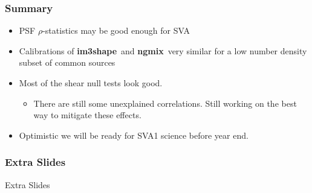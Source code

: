 \documentclass{beamer}
\newcommand{\ngmix}{{\bf ngmix}}
\newcommand{\imshape}{{\bf im3shape}}
\begin{document}
\frame
{
    \frametitle{Summary}

    \begin{itemize}

        \item PSF $\rho$-statistics may be good enough for SVA

        \item Calibrations of \imshape\ and \ngmix\ very similar for a low number
            density subset of common sources

        \item Most of the shear null tests look good.

            \begin{itemize}

                \item There are still some unexplained correlations.  Still working
                    on the best way to mitigate these effects.

            \end{itemize}
            
        \item Optimistic we will be ready for SVA1 science before year end.

    \end{itemize}
}


\frame
{
    \frametitle{Extra Slides}
    {\Huge Extra Slides}
}
\end{document}
